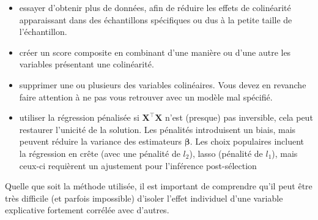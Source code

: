 \documentclass[
  11pt,
  letterpaper,
]{scrbook}
\providecommand{\tightlist}{%
  \setlength{\itemsep}{0pt}\setlength{\parskip}{0pt}}\usepackage{longtable,booktabs,array}
\theoremstyle{plain}
\theoremstyle{plain}
\theoremstyle{definition}
\theoremstyle{definition}
\theoremstyle{remark}
\begin{document}
\begin{itemize}
\tightlist
\item
  essayer d'obtenir plus de données, afin de réduire les effets de
  colinéarité apparaissant dans des échantillons spécifiques ou dus à la
  petite taille de l'échantillon.
\item
  créer un score composite en combinant d'une manière ou d'une autre les
  variables présentant une colinéarité.
\item
  supprimer une ou plusieurs des variables colinéaires. Vous devez en
  revanche faire attention à ne pas vous retrouver avec un modèle mal
  spécifié.
\item
  utiliser la régression pénalisée si \(\mathbf{X}^\top\mathbf{X}\)
  n'est (presque) pas inversible, cela peut restaurer l'unicité de la
  solution. Les pénalités introduisent un biais, mais peuvent réduire la
  variance des estimateurs \(\boldsymbol{\beta}.\) Les choix populaires
  incluent la régression en crête (avec une pénalité de \(l_2\)), lasso
  (pénalité de \(l_1\)), mais ceux-ci requièrent un ajustement pour
  l'inférence post-sélection
\end{itemize}

Quelle que soit la méthode utilisée, il est important de comprendre
qu'il peut être très difficile (et parfois impossible) d'isoler l'effet
individuel d'une variable explicative fortement corrélée avec d'autres.
\end{document}
